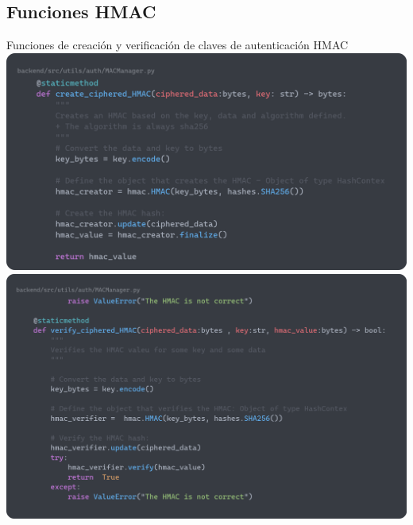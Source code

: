 \documentclass[a4paper,11pt]{article}
\begin{document}
\subsection{Funciones HMAC}
    \label{sec:HMACCode}
    Funciones de creación y verificación de claves de autenticación HMAC
    \vspace{0.5cm}
    \includegraphics[width=\textwidth]{images/HMAC_create.png}
    \includegraphics[width=\textwidth]{images/HMAC_verify.png} 
\end{document}
